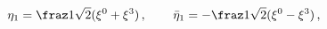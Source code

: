 \begin{equation}
\eta_1=\fraz 1{\sqrt{2}} (\xi^0+\xi^3)\,,\phantom{+i\xi2}
{\bar\eta}_1=-\fraz 1{\sqrt{2}}(\xi^0-\xi^3)\,,
\end{equation}

